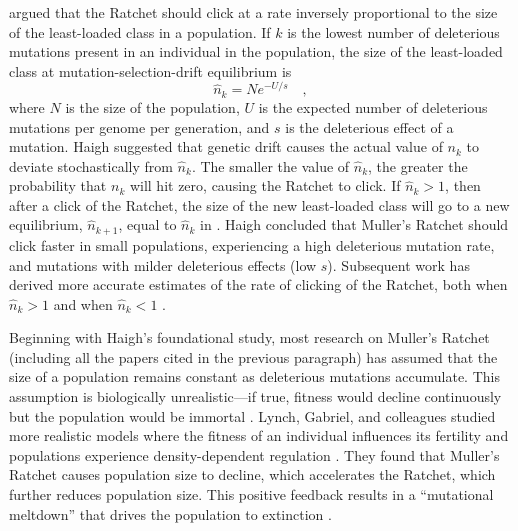 \documentclass[9pt,lineno]{elife}
\begin{document}
\citet{Haigh_The_1978} argued that the Ratchet should click at a rate inversely proportional to the size of the least-loaded class in a population.  If $k$ is the lowest number of deleterious mutations present in an individual in the population, 
the size of the least-loaded class at mutation-selection-drift equilibrium is
%
\begin{equation}
  \hat n_k = N e^{-U/s} \quad ,
  \label{eq:haigh}
\end{equation}
%
where $N$ is the size of the population, $U$ is the 
expected number of deleterious mutations
per genome per generation, and $s$ is the deleterious effect of a mutation. 
Haigh suggested that genetic drift causes the actual value of $n_k$ to deviate stochastically from $\hat n_k$.  The smaller the value of $\hat n_k$, the greater the probability that $n_k$ will hit zero, causing the Ratchet to click.  
If $\hat n_k > 1$, then after a click of the Ratchet, the size of the new least-loaded class will go to a new equilibrium, $\hat n_{k+1}$, equal to $\hat n_k$ in . 
Haigh concluded that Muller's Ratchet should click faster 
in small populations, 
experiencing a high deleterious mutation rate, 
and mutations with milder deleterious effects (low $s$).
Subsequent work has derived more accurate estimates of the rate of clicking of the Ratchet, both when $\hat n_k > 1$ \citep{Stephan_The_1993, Gordo_On_2000, gor00b, Neher_Fluctuations_2012, met13} and when $\hat n_k < 1$ \citep{Gessler_The_1995, Rouzine_The_2003, Rouzine_The_2008}. 

Beginning with Haigh's foundational study, most research on Muller's Ratchet (including all the papers cited in the previous paragraph) has assumed that 
the size of a population remains constant as deleterious mutations accumulate.  
This assumption is biologically unrealistic---if true, fitness would decline continuously but the population would be immortal \citep{Lynch_MUTATION_1990, mel91}.  Lynch, Gabriel, and colleagues studied more realistic models where the fitness of an individual influences its fertility and populations experience density-dependent regulation \citep{Lynch_MUTATION_1990, lyn93, Gabriel_MULLER_1993, lyn95}.  They found that Muller's Ratchet causes population size to decline, which accelerates the Ratchet, which further reduces population size.  This positive feedback results in a ``mutational meltdown'' that drives the population to extinction \citep{Lynch_MUTATION_1990, lyn93, Gabriel_MULLER_1993}. 
\end{document}
